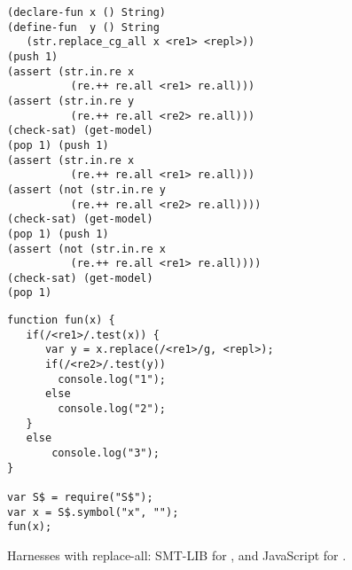 \begin{figure}[tb]
  \scriptsize

  \begin{minipage}{0.49\linewidth}
\begin{verbatim}
(declare-fun x () String)
(define-fun  y () String
   (str.replace_cg_all x <re1> <repl>))
(push 1)
(assert (str.in.re x 
          (re.++ re.all <re1> re.all)))
(assert (str.in.re y 
          (re.++ re.all <re2> re.all)))
(check-sat) (get-model)
(pop 1) (push 1)
(assert (str.in.re x 
          (re.++ re.all <re1> re.all)))
(assert (not (str.in.re y 
          (re.++ re.all <re2> re.all))))
(check-sat) (get-model)
(pop 1) (push 1)
(assert (not (str.in.re x 
          (re.++ re.all <re1> re.all))))
(check-sat) (get-model)
(pop 1)
\end{verbatim}
  \end{minipage}\hfill
  \raisebox{-19ex}{\rule{0.4pt}{39.5ex}}\hfill
  \begin{minipage}{0.49\linewidth}
\begin{verbatim}
function fun(x) {
   if(/<re1>/.test(x)) {
      var y = x.replace(/<re1>/g, <repl>);
      if(/<re2>/.test(y))
        console.log("1");
      else
        console.log("2");
   }
   else
       console.log("3");
}

var S$ = require("S$");
var x = S$.symbol("x", "");
fun(x);
\end{verbatim}
  \end{minipage}
  
  \caption{Harnesses with replace-all: SMT-LIB for \ostrich,
    and JavaScript for \expose{}.}
  \label{fig:harness}
\end{figure}

